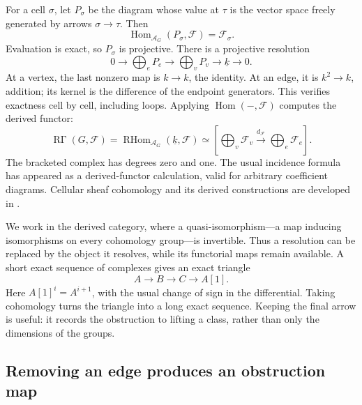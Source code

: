 \documentclass[11pt]{article}
\theoremstyle{definition}
\theoremstyle{remark}
\begin{document}
For a cell $\sigma$, let $P_\sigma$ be the diagram whose value at $\tau$ is the vector space freely generated by arrows $\sigma\to\tau$. Then
\[
 \operatorname{Hom}_{\mathcal A_G}(P_\sigma,\mathcal F)=\mathcal F_\sigma.
\]
Evaluation is exact, so $P_\sigma$ is projective. There is a projective resolution
\begin{equation}\label{eq:derived-projective-resolution}
 0\longrightarrow\bigoplus_e P_e
 \longrightarrow\bigoplus_v P_v
 \longrightarrow\underline k\longrightarrow0.
\end{equation}
At a vertex, the last nonzero map is $k\to k$, the identity. At an edge, it is $k^2\to k$, addition; its kernel is the difference of the endpoint generators. This verifies exactness cell by cell, including loops. Applying $\operatorname{Hom}(-,\mathcal F)$ computes the derived functor:
\begin{equation}\label{eq:derived-graph-global-sections}
 \operatorname{R\Gamma}(G,\mathcal F)
 =\operatorname{RHom}_{\mathcal A_G}(\underline k,\mathcal F)
 \simeq\left[\bigoplus_v\mathcal F_v
 \xrightarrow{d_{\mathcal F}}\bigoplus_e\mathcal F_e\right].
\end{equation}
The bracketed complex has degrees zero and one. The usual incidence formula has appeared as a derived-functor calculation, valid for arbitrary coefficient diagrams. Cellular sheaf cohomology and its derived constructions are developed in \cite{derivedCurry}.

We work in the derived category, where a quasi-isomorphism---a map inducing isomorphisms on every cohomology group---is invertible. Thus a resolution can be replaced by the object it resolves, while its functorial maps remain available. A short exact sequence of complexes gives an exact triangle
\[
 A\longrightarrow B\longrightarrow C\longrightarrow A[1].
\]
Here $A[1]^i=A^{i+1}$, with the usual change of sign in the differential. Taking cohomology turns the triangle into a long exact sequence. Keeping the final arrow is useful: it records the obstruction to lifting a class, rather than only the dimensions of the groups.

\subsection{Removing an edge produces an obstruction map}
\end{document}
